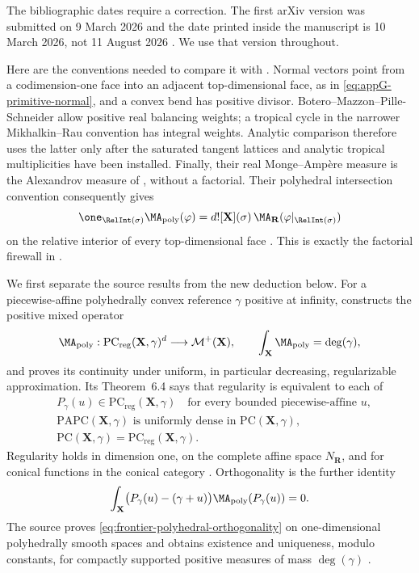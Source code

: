 The bibliographic dates require a correction.  The first arXiv version was
submitted on 9 March 2026 and the date printed inside the manuscript is
10 March 2026, not 11 August 2026 \cite{BMPS26}.  We use that version
throughout.

Here are the conventions needed to compare it with
.  Normal vectors point from a codimension-one
face into an adjacent top-dimensional face, as in
\eqref{eq:appG-primitive-normal}, and a convex bend has positive divisor.
Botero--Mazzon--Pille-Schneider allow positive real balancing weights; a
tropical cycle in the narrower Mikhalkin--Rau convention has integral
weights.  Analytic comparison therefore uses the latter only after the
saturated tangent lattices and analytic tropical multiplicities have been
installed.  Finally, their real Monge--Amp\`ere measure is the Alexandrov
measure of , without a factorial.  Their
polyhedral intersection convention consequently gives
\begin{equation}
 \one_{\RelInt(\sigma)}\MA_{\mathrm{poly}}(\varphi)
 =d![\mathbf X](\sigma)\,
   \MA_{\mathbf R}(\varphi|_{\RelInt(\sigma)})
 \label{eq:frontier-polyhedral-real-local}
\end{equation}
on the relative interior of every top-dimensional face
\cite[Propositions~4.12 and~4.20]{BMPS26}.  This is exactly the factorial
firewall in .

We first separate the source results from the new deduction below.  For a
piecewise-affine polyhedrally convex reference \(\gamma\) positive at
infinity, \cite[Theorem~4.13 and Proposition~4.16]{BMPS26} constructs the
positive mixed operator
\[
 \MA_{\mathrm{poly}}:
 \mathrm{PC}_{\mathrm{reg}}(\mathbf X,\gamma)^d
 \longrightarrow\mathcal M^+(\mathbf X),
 \qquad
 \int_{\mathbf X}\MA_{\mathrm{poly}}=\deg(\gamma),
\]
and proves its continuity under uniform, in particular decreasing,
regularizable approximation.  Its Theorem~6.4 says that regularity is
equivalent to each of
\[
 \begin{split}
 &P_\gamma(u)\in\mathrm{PC}_{\mathrm{reg}}(\mathbf X,\gamma)
       \quad\text{for every bounded piecewise-affine }u,\\
 &\mathrm{PAPC}(\mathbf X,\gamma)
       \text{ is uniformly dense in }\mathrm{PC}(\mathbf X,\gamma),\\
 &\mathrm{PC}(\mathbf X,\gamma)
       =\mathrm{PC}_{\mathrm{reg}}(\mathbf X,\gamma).
 \end{split}
\]
Regularity holds in dimension one, on the complete affine space
\(N_{\mathbf R}\), and for conical functions in the conical category
\cite[Proposition~6.13 and Remark~6.6]{BMPS26}.  Orthogonality is the further
identity
\begin{equation}
 \int_{\mathbf X}
 \bigl(P_\gamma(u)-(\gamma+u)\bigr)
 \MA_{\mathrm{poly}}(P_\gamma(u))=0.
 \label{eq:frontier-polyhedral-orthogonality}
\end{equation}
The source proves \eqref{eq:frontier-polyhedral-orthogonality} on
one-dimensional polyhedrally smooth spaces and obtains existence and
uniqueness, modulo constants, for compactly supported positive measures of
mass \(\deg(\gamma)\)
\cite[Proposition~6.21 and Theorem~6.22]{BMPS26}.

